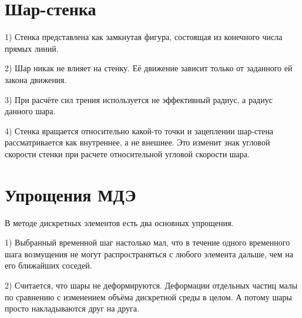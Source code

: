 \documentclass[a4paper]{article}
\begin{document}
\section{Шар-стенка}

1) Стенка представлена как замкнутая фигура, состоящая из конечного числа прямых линий.

2) Шар никак не влияет на стенку. 
Её движение зависит только от заданного ей закона движения.

3) При расчёте сил трения используется не эффективный радиус, а радиус данного шара.

4) Стенка вращается относительно какой-то точки и зацеплении шар-стена рассматривается как внутреннее, а не внешнее. 
Это изменит знак угловой скорости стенки при расчете относительной угловой скорости шара.


\section{Упрощения МДЭ}

В методе дискретных элементов есть два основных упрощения.

1) Выбранный временной шаг настолько мал, что в течение одного временного шага возмущения не могут распространяться с любого элемента дальше, чем на его ближайших соседей. 

2) Считается, что шары не деформируются.
Деформации отдельных частиц малы по сравнению с изменением объёма дискретной среды в целом.
А потому шары просто накладываются друг на друга.
\end{document}

